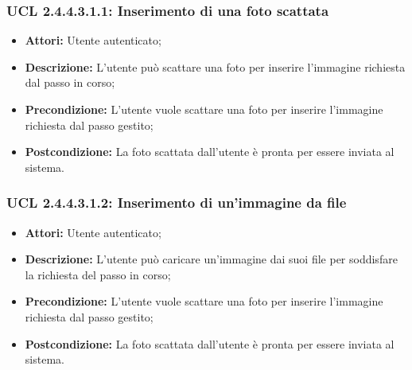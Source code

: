 \hypertarget{L2.4.4.3.1.1}{}
\subsubsection{UCL 2.4.4.3.1.1: Inserimento di una foto scattata}
\begin{itemize}
\item \textbf{Attori:} Utente autenticato;
\item \textbf{Descrizione:} L'utente può scattare una foto per inserire l'immagine richiesta dal passo in corso;
\item \textbf{Precondizione:} L'utente vuole scattare una foto per inserire l'immagine richiesta dal passo gestito;
\item \textbf{Postcondizione:} La foto scattata dall'utente è pronta per essere inviata al sistema.
\end{itemize}

\hypertarget{L2.4.4.3.1.2}{}
\subsubsection{UCL 2.4.4.3.1.2: Inserimento di un'immagine da file}
\begin{itemize}
\item \textbf{Attori:} Utente autenticato;
\item \textbf{Descrizione:} L'utente può caricare un'immagine dai suoi file per soddisfare la richiesta del passo in corso;
\item \textbf{Precondizione:} L'utente vuole scattare una foto per inserire l'immagine richiesta dal passo gestito;
\item \textbf{Postcondizione:} La foto scattata dall'utente è pronta per essere inviata al sistema.
\end{itemize}

\hypertarget{L2.4.4.3.2}{}
